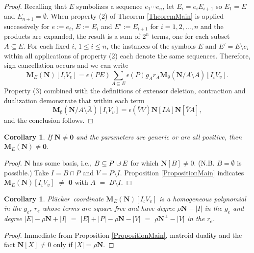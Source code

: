\documentclass[12pt]{article}
\newtheorem{corollary}[theorem]{Corollary}
\theoremstyle{definition}
\newcommand{\dunion}
{\mbox{\hbox{\hskip6pt$\cdot$\hskip-5.50pt$\cup$\hskip2pt}}}
\newcommand{\Is}{\ensuremath{\iota}}
\newcommand{\Vs}{\ensuremath{\upsilon}}
\newcommand{\Rank}{{\rho}}%
\newcommand{\Card}[1]{\ensuremath{{\left|#1\right|}}}
\newcommand{\ext}[1]{\ensuremath{\mathbf{#1}}}
\newcommand{\Plucker}{Pl\"{u}cker\ }
\begin{document}
\begin{proof}
Recalling that $E$ symbolizes a sequence $e_1\cdots e_n$, 
let $E_{i}=e_iE_{i+1}$ so $E_1=E$ and $E_{n+1}=\emptyset$.
When property (2) of Theorem \ref{TheoremMain}
is applied successively for $e:=e_i$, $E:=E_i$ and
$E':=E_{i+1}$ for $i=1,2,\ldots,n$
and the products are expanded, the result is a sum
of $2^n$ terms, one for each subset $A\subseteq E$.
For each fixed $i$, $1\leq i\leq n$,
the instances of 
the symbols $E$ and $E'=E\setminus e_i$ within 
all applications of property (2) each denote the same sequences.
Therefore, sign cancellation occurs and we can write
\begin{equation}
\label{PairsExpansionFormula}
\ext{M}_E(\ext{N})[I_{\Is}V_{\Vs}] = \epsilon(PE)
\sum_{A\subseteq E}\epsilon(P)g_Ar_{\bar{A}}
\ext{M}_{\emptyset}(\ext{N}/A\setminus\bar{A})[I_{\Is}V_{\Vs}].
\end{equation}
Property (3) combined with the definitions of extensor deletion,
contraction and dualization demonstrate that within each term
\[
\ext{M}_{\emptyset}(\ext{N}/A\setminus\bar{A})[I_{\Is}V_{\Vs}]
=
\epsilon(\bar{V}V)\ext{N}[IA]\ext{N}[\bar{V}A],
\]
and the conclusion follows.
\end{proof}

\begin{corollary}
\label{PairsMENisNonZero}
If $\ext{N}\neq\ext{0}$ and the parameters are generic or are all
positive, then $\ext{M}_E(\ext{N})\neq\ext{0}$.
\end{corollary}
\begin{proof}
$\ext{N}$ has some basis, i.e., $B\subseteq P\dunion E$ for which $\ext{N}[B]\neq 0$.
(N.B. $B=\emptyset$ is possible.)   Take $I=B\cap P$ and $V=P\setminus I$.
Proposition \ref{PropositionMain} indicates 
$\ext{M}_E(\ext{N})[I_\Is V_\Vs]$ $\neq$ $\ext{0}$ 
with $A$ $=$ $B\setminus I$.
\end{proof}


\begin{corollary}
\label{PairsCorollaryHomoDegree}
\Plucker coordinate $\ext{M}_E(\ext{N})[I_{\Is}V_{\Vs}]$ is a homogeneous
polynomial in the $g_e$, $r_e$ whose terms are square-free and have
degree $\Rank{\ext{N}}-\Card{I}$ in the $g_e$ and degree 
$\Card{E}-\Rank{\ext{N}}+\Card{I}$ $=$ 
$\Card{E}+\Card{P}-\Rank{\ext{N}}-\Card{V}$
$=$ $\Rank{\ext{N}^{\perp}}-\Card{V}$ in the $r_e$.
\end{corollary}

\begin{proof}
Immediate from Proposition
\ref{PropositionMain}, matroid duality and the fact $\ext{N}[X]\neq 0$
only if $\Card{X}=\Rank{\ext{N}}$.
\end{proof}
\end{document}
